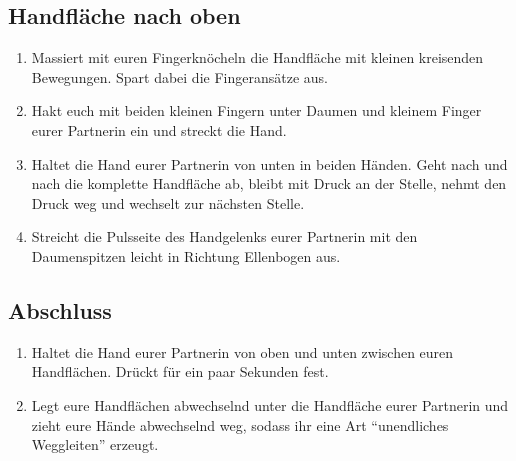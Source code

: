 \pagebreak
\subsection{Handfläche nach oben}
\begin{enumerate}
  \item {} Massiert mit euren Fingerknöcheln die Handfläche mit kleinen kreisenden Bewegungen. Spart dabei die Fingeransätze aus.
  \item {} Hakt euch mit beiden kleinen Fingern unter Daumen und kleinem Finger eurer Partnerin ein und streckt die Hand.
  \item {} Haltet die Hand eurer Partnerin von unten in beiden Händen. Geht nach und nach die komplette Handfläche ab, bleibt mit Druck an der Stelle, nehmt den Druck weg und wechselt zur nächsten Stelle.
  \item {} Streicht die Pulsseite des Handgelenks eurer Partnerin mit den Daumenspitzen leicht in Richtung Ellenbogen aus.
\end{enumerate}

\subsection{Abschluss}
\begin{enumerate}
  \item {} Haltet die Hand eurer Partnerin von oben und unten zwischen euren Handflächen. Drückt für ein paar Sekunden fest.
  \item {} Legt eure Handflächen abwechselnd unter die Handfläche eurer Partnerin und zieht eure Hände abwechselnd weg, sodass ihr eine Art "`unendliches Weggleiten"' erzeugt.
\end{enumerate}

